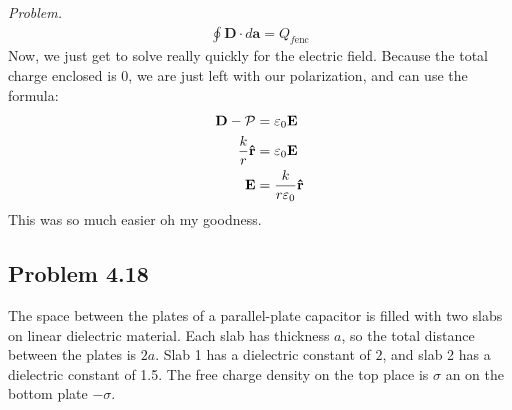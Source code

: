 \documentclass[10pt,oneside]{book}
\newcommand{\gspc}{\vspace{0.13cm}} %
\newenvironment{problem}[1]
  {\vspace{-0.1cm}\begin{tcolorbox}[problembox]
   \textit{Problem. }#1}
  {\end{tcolorbox}\gspc}
\newcommand{\unit}[1]{\mathbf{\hat{#1}}}
\begin{document}
\begin{enumerate}
\begin{problem}
\begin{align*}
      \boxed{\oint \mathbf D\cdot d\mathbf a = Q_{f\text{enc}}}
    \end{align*}
    Now, we just get to solve really quickly for the electric field. Because the total charge enclosed is 0, we are just left with our polarization, and can use the formula:
    \begin{align*}
      \mathbf D  - \mathcal P &=\varepsilon_0 \vE\\
      \frac{k}r\unit{r}&= \varepsilon_0 \vE\\
      \vE &= \frac{k}{r\varepsilon_0}\unit{r}
    \end{align*}
    This was so much easier oh my goodness. 
  \end{problem}
\end{enumerate}

\subsection*{Problem 4.18}
The space between the plates of a parallel-plate capacitor is filled with two slabs on linear dielectric material. Each slab has thickness $a$, so the total distance between the plates is $2a$. Slab 1 has a dielectric constant of $2$, and slab 2 has a dielectric constant of 1.5. The free charge density on the top place is $\sigma$ an on the bottom plate $-\sigma$. 
\end{document}
